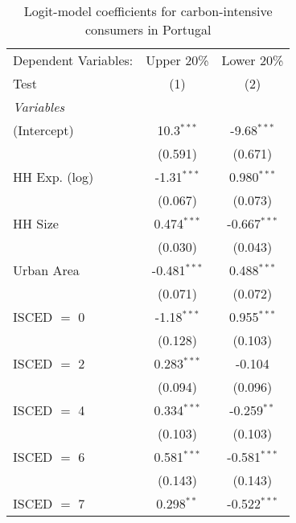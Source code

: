 
\begin{table}[htbp!]
   \centering
   \small
   \begin{adjustbox}{width = 1\textwidth, max height = 0.95\textheight, center}
      \begin{threeparttable}[b]
         \caption{\label{tab:Logit_1_PRT} Logit-model coefficients for carbon-intensive consumers in Portugal}
         \begin{tabular}{lcc}
            \tabularnewline \midrule \midrule
            Dependent Variables: & Upper 20\%     & Lower 20\%\\   
            Test                 & (1)            & (2)\\  
            \midrule
            \emph{Variables}\\
            (Intercept)          & 10.3$^{***}$   & -9.68$^{***}$\\   
                                 & (0.591)        & (0.671)\\   
            HH Exp. (log)        & -1.31$^{***}$  & 0.980$^{***}$\\   
                                 & (0.067)        & (0.073)\\   
            HH Size              & 0.474$^{***}$  & -0.667$^{***}$\\   
                                 & (0.030)        & (0.043)\\   
            Urban Area           & -0.481$^{***}$ & 0.488$^{***}$\\   
                                 & (0.071)        & (0.072)\\   
            ISCED $=$ 0          & -1.18$^{***}$  & 0.955$^{***}$\\   
                                 & (0.128)        & (0.103)\\   
            ISCED $=$ 2          & 0.283$^{***}$  & -0.104\\   
                                 & (0.094)        & (0.096)\\   
            ISCED $=$ 4          & 0.334$^{***}$  & -0.259$^{**}$\\   
                                 & (0.103)        & (0.103)\\   
            ISCED $=$ 6          & 0.581$^{***}$  & -0.581$^{***}$\\   
                                 & (0.143)        & (0.143)\\   
            ISCED $=$ 7          & 0.298$^{**}$   & -0.522$^{***}$\\   

\end{tabular}
\end{threeparttable}
\end{adjustbox}
\end{table}
